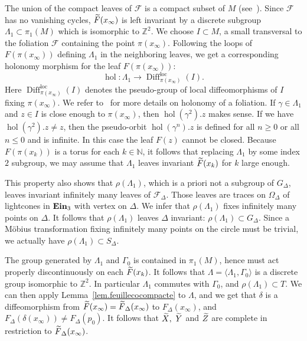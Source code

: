 \documentclass[11pt]{article}
\theoremstyle{definition}
\numberwithin{equation}{section}
\numberwithin{figure}{section}
\numberwithin{table}{section}
\DeclareMathOperator{\ein}{{\bf Ein}_3}
\DeclareMathOperator{\hol}{hol}
\DeclareMathOperator{\Diff}{Diff}
\DeclareMathOperator{\loc}{loc}
\newcommand{\calf}{\mathcal{F}}
\newcommand{\tX}{\tilde{{X}}}
\newcommand{\tY}{\tilde{{Y}}}
\newcommand{\tZ}{\tilde{{Z}}}
\newcommand{\tFd}{\tilde{{F}}_{\Delta}}
\newcommand{\tF}{\tilde{{F}}}
\newcommand{\calfd}{{{\mathcal{F}}}_{\Delta}}
\newcommand*\NN{\mathbb{N}}
\newcommand*\ZZ{\mathbb{Z}}
\let\oldtilde\tilde
\renewcommand*\tilde[1]{\mathchoice{\widetilde{#1}}{\widetilde{#1}}{\widetilde{#1}}{\oldtilde{#1}}}
\begin{document}
The union of the compact leaves of $\calf$ is a compact subset of $M$ (see~\cite[Chapter~II, Corollary~3.10]{godbillon}). Since $\calf$ has no vanishing cycles, $\tF(x_{\infty})$ is left invariant by a discrete subgroup $\Lambda_1 \subset \pi_1(M)$ which is isomorphic to $\ZZ^2$. We choose $I \subset M$, a small transversal to the foliation $\calf$ containing the point $\pi(x_{\infty})$. Following the loops of $F(\pi(x_{\infty}))$ defining $\Lambda_1$ in the neighboring leaves, we get a corresponding holonomy morphism for the leaf $F(\pi(x_{\infty}))$:
\[
\hol: \Lambda_1 \to \Diff_{\pi(x_{\infty})}^{\loc}(I).
\]
Here $\Diff_{\pi(x_{\infty})}^{\loc}(I)$ denotes the pseudo-group of local diffeomorphisms of $I$ fixing $\pi(x_{\infty})$. We refer to~\cite[Chapter~II]{godbillon} for more details on holonomy of a foliation. If $\gamma \in \Lambda_1$ and $z \in I$ is close enough to $\pi(x_{\infty})$, then ${\hol}(\gamma^2).z$ makes sense. If we have ${\hol}(\gamma^2).z \not = z$, then the pseudo-orbit ${\hol}(\gamma^n).z$ is defined for all $n \geq 0$ or all $n \leq 0$ and is infinite. In this case the leaf $F(z)$ cannot be closed. Because $F(\pi(x_k))$ is a torus for each $k \in \NN$, it follows that replacing $\Lambda_1$ by some index $2$ subgroup, we may assume that $\Lambda_1$ leaves invariant $\tF(x_k)$ for $k$ large enough.

This property also shows that $\rho(\Lambda_1)$, which is a priori not a subgroup of $G_{\Delta}$, leaves invariant infinitely many leaves of $\calfd$. Those leaves are traces on $\Omega_{\Delta}$ of lightcones in $\ein$ with vertex on $\Delta$. We infer that $\rho(\Lambda_1)$ fixes infinitely many points on $\Delta$. It follows that $\rho(\Lambda_1)$ leaves $\Delta$ invariant: $\rho(\Lambda_1) \subset G_{\Delta}$. Since a Möbius transformation fixing infinitely many points on the circle must be trivial, we actually have $\rho(\Lambda_1) \subset S_{\Delta}$.

The group generated by $\Lambda_1$ and $\Gamma_0$ is contained in $\pi_1(M)$, hence must act properly discontinuously on each $\tF(x_k)$. It follows that $\Lambda=\langle\Lambda_1,\Gamma_0\rangle$ is a discrete group isomorphic to $\ZZ^2$. In particular $\Lambda_1$ commutes with $\Gamma_0$, and $\rho(\Lambda_1) \subset T$. We can then apply Lemma~\ref{lem.feuillecocompacte} to $\Lambda$, and we get that $\delta$ is a diffeomorphism from $\tF(x_{\infty})=\tFd(x_{\infty})$ to $F_{\Delta}(x_{\infty})$, and $F_{\Delta}(\delta(x_{\infty})) \not = F_{\Delta}(p_0)$. It follows that $\tX,\ \tY$ and $\tZ$ are complete in restriction to $\tFd(x_{\infty})$.
\end{document}
